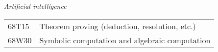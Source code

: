 {\it Artificial intelligence} \\[4pt]
\begin{tabular}{ll}
\phantom{XX} 68T15   &  Theorem proving (deduction, resolution, etc.)\\
\phantom{XX} 68W30 &  Symbolic computation and algebraic computation %
\end{tabular}
